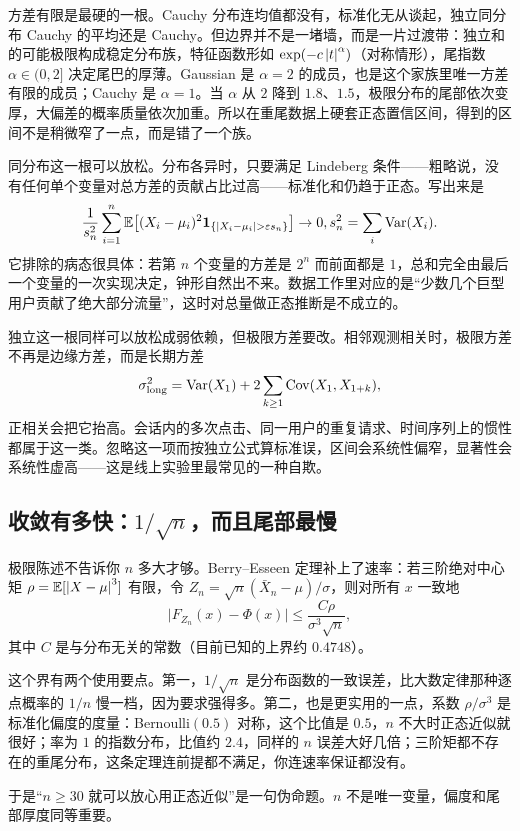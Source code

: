 方差有限是最硬的一根。Cauchy 分布连均值都没有，标准化无从谈起，独立同分布 Cauchy 的平均还是 Cauchy。但边界并不是一堵墙，而是一片过渡带：独立和的可能极限构成稳定分布族，特征函数形如 \(\exp(-c\left|t\right|^\alpha)\)（对称情形），尾指数 \(\alpha\in(0,2]\) 决定尾巴的厚薄。Gaussian 是 \(\alpha=2\) 的成员，也是这个家族里唯一方差有限的成员；Cauchy 是 \(\alpha=1\)。当 \(\alpha\) 从 \(2\) 降到 \(1.8\)、\(1.5\)，极限分布的尾部依次变厚，大偏差的概率质量依次加重。所以在重尾数据上硬套正态置信区间，得到的区间不是稍微窄了一点，而是错了一个族。

同分布这一根可以放松。分布各异时，只要满足 Lindeberg 条件——粗略说，没有任何单个变量对总方差的贡献占比过高——标准化和仍趋于正态。写出来是
\[
\frac1{s_n^2}\sum_{i=1}^n\E\bigl[(X_i-\mu_i)^2\ind_{\set{\abs{X_i-\mu_i}>\varepsilon s_n}}\bigr]\to0,
\qquad s_n^2=\sum_i\Var(X_i).
\]
它排除的病态很具体：若第 \(n\) 个变量的方差是 \(2^n\) 而前面都是 \(1\)，总和完全由最后一个变量的一次实现决定，钟形自然出不来。数据工作里对应的是``少数几个巨型用户贡献了绝大部分流量''，这时对总量做正态推断是不成立的。

独立这一根同样可以放松成弱依赖，但极限方差要改。相邻观测相关时，极限方差不再是边缘方差，而是长期方差
\[
\sigma^2_{\text{long}}=\operatorname{Var}(X_1)+2\sum_{k\ge1}\operatorname{Cov}(X_1,X_{1+k}),
\]
正相关会把它抬高。会话内的多次点击、同一用户的重复请求、时间序列上的惯性都属于这一类。忽略这一项而按独立公式算标准误，区间会系统性偏窄，显著性会系统性虚高——这是线上实验里最常见的一种自欺。

\subsection{收敛有多快：\texorpdfstring{\(1/\sqrt n\)}{1/sqrt n}，而且尾部最慢}

极限陈述不告诉你 \(n\) 多大才够。Berry--Esseen 定理补上了速率：若三阶绝对中心矩 \(\rho=\mathbb{E}[\left|X-\mu\right|^3]\) 有限，令 \(Z_n=\sqrt n(\bar X_n-\mu)/\sigma\)，则对所有 \(x\) 一致地
\[
\bigl|F_{Z_n}(x)-\Phi(x)\bigr|\le\frac{C\rho}{\sigma^3\sqrt n},
\]
其中 \(C\) 是与分布无关的常数（目前已知的上界约 \(0.4748\)）。

这个界有两个使用要点。第一，\(1/\sqrt n\) 是分布函数的一致误差，比大数定律那种逐点概率的 \(1/n\) 慢一档，因为要求强得多。第二，也是更实用的一点，系数 \(\rho/\sigma^3\) 是标准化偏度的度量：Bernoulli\((0.5)\) 对称，这个比值是 \(0.5\)，\(n\) 不大时正态近似就很好；率为 \(1\) 的指数分布，比值约 \(2.4\)，同样的 \(n\) 误差大好几倍；三阶矩都不存在的重尾分布，这条定理连前提都不满足，你连速率保证都没有。

于是``\(n\ge30\) 就可以放心用正态近似''是一句伪命题。\(n\) 不是唯一变量，偏度和尾部厚度同等重要。

